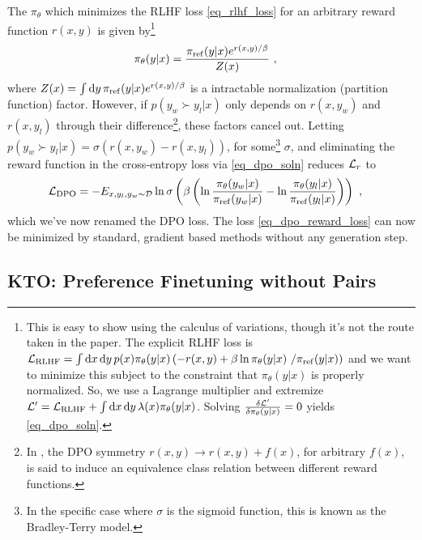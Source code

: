The $ \pi _{ \theta  } $ which minimizes the RLHF loss \eqref{eq_rlhf_loss} for
an arbitrary reward function $ r(x, y) $ is given by\footnote{This is easy to show using the
calculus of variations, though it's not the route taken in the paper. The explicit RLHF loss is $
\mathcal{L} _{ {\rm RLHF} } = \int {\rm d} x\,{\rm d} y\,p(x) \pi _{ \theta  }(y|x)\left ( -r(x,y) +\beta \ln \pi _{
\theta }(y|x)\ /\pi _{ {\rm ref} }(y|x) \right )  $ and we want to minimize this subject to the
constraint that $ \pi _{ \theta  }(y|x) $ is properly normalized. So, we use a Lagrange multiplier
and extremize $ \mathcal{L}'  = \mathcal{L} _{ {\rm RLHF} }+ \int {\rm d} x\,{\rm d} y\, \lambda (x) \pi _{ \theta
}(y|x)   $. Solving $ \frac{ \delta \mathcal{L} ' }{ \delta \pi _{ \theta  } (y|x)} =0$ yields
\eqref{eq_dpo_soln}.
}
\begin{align}
\pi _{\theta}(y|x) &= \frac{ \pi _{ {\rm ref}} (y|x)e ^{ r(x, y)/ \beta  }  }{ Z(x) } \ ,\label{eq_dpo_soln}
\end{align}
where $ Z(x) = \int {\rm d} y\, \pi _{ {\rm ref} }(y|x)e^{ r(x, y)/ \beta  }$ is a intractable
normalization (partition function) factor. However, if  $p(y _{ w } \succ y _{ l }| x )$ only
depends on $ r(x, y _{ w }) $ and $ r(x, y _{ l }) $ through their difference\footnote{In
\cite{rafailov2024directpreferenceoptimizationlanguage}, the DPO symmetry $ r(x, y)\longrightarrow r(x,
y) + f(x) $, for arbitrary $ f(x) $, is said to induce an equivalence class relation between
different reward functions.}, these factors cancel
out. Letting $ p(y _{ w } \succ y _{ l }| x ) = \sigma ( r(x, y _{ w })- r(x, y _{ l }) ) $, for
some\footnote{In the specific case where $ \sigma  $ is the sigmoid function, this is known as the
Bradley-Terry model.} $ \sigma  $, and eliminating the reward function in the cross-entropy loss via
\eqref{eq_dpo_soln} reduces $ \mathcal{L} _{ r } $ to
\begin{align}
    \mathcal{L} _{ {\rm DPO} } &= -E _{ x, y _{ l }, y _{ w } \sim \mathcal{D} } \ln \sigma \left (\beta \left (\ln \frac{ \pi _{
\theta }(y_{ w }|x ) }{ \pi _{ {\rm ref} }(y_{ w }|x ) }-\ln \frac{ \pi _{ \theta }(y _{ l }|x) }{ \pi
_{ {\rm ref} }(y _{  l}|x) }  \right )\right ) \ , \label{eq_dpo_reward_loss}
\end{align}
which we've now renamed the DPO loss.   The loss \eqref{eq_dpo_reward_loss} can now be minimized by
standard, gradient based methods without any generation step.



\subsection{KTO: Preference Finetuning without Pairs \label{subsec_kto}}


